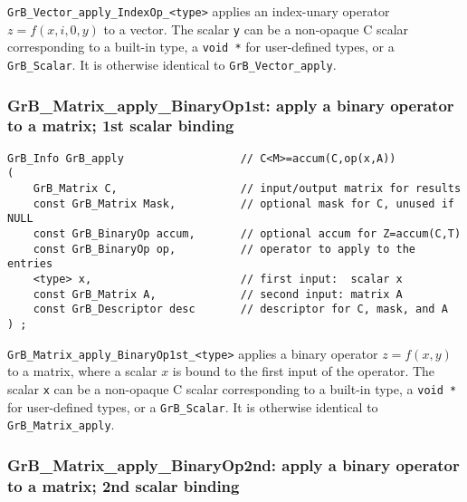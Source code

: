 \documentclass[12pt]{article}
\begin{document}
{\verb'GrB_Vector_apply_IndexOp_<type>'  applies an index-unary operator
$z=f(x,i,0,y)$ to a vector.
The scalar \verb'y' can be a non-opaque C scalar corresponding to a built-in
type, a \verb'void *' for user-defined types, or a \verb'GrB_Scalar'.
It is otherwise identical to \verb'GrB_Vector_apply'.

\subsubsection{{\sf GrB\_Matrix\_apply\_BinaryOp1st:} apply a binary operator to a matrix; 1st scalar binding}
\label{matrix_apply1st}

\begin{mdframed}[userdefinedwidth=6in]
{\footnotesize
\begin{verbatim}
GrB_Info GrB_apply                  // C<M>=accum(C,op(x,A))
(
    GrB_Matrix C,                   // input/output matrix for results
    const GrB_Matrix Mask,          // optional mask for C, unused if NULL
    const GrB_BinaryOp accum,       // optional accum for Z=accum(C,T)
    const GrB_BinaryOp op,          // operator to apply to the entries
    <type> x,                       // first input:  scalar x
    const GrB_Matrix A,             // second input: matrix A
    const GrB_Descriptor desc       // descriptor for C, mask, and A
) ;
\end{verbatim} } \end{mdframed}

\verb'GrB_Matrix_apply_BinaryOp1st_<type>'  applies a binary operator
$z=f(x,y)$ to a matrix, where a scalar $x$ is bound to the first input of the
operator. 
The scalar \verb'x' can be a non-opaque C scalar corresponding to a built-in
type, a \verb'void *' for user-defined types, or a \verb'GrB_Scalar'.
It is otherwise identical to \verb'GrB_Matrix_apply'.

\newpage
\subsubsection{{\sf GrB\_Matrix\_apply\_BinaryOp2nd:} apply a binary operator to a matrix; 2nd scalar binding}
\label{matrix_apply2nd}

}
\end{document}
